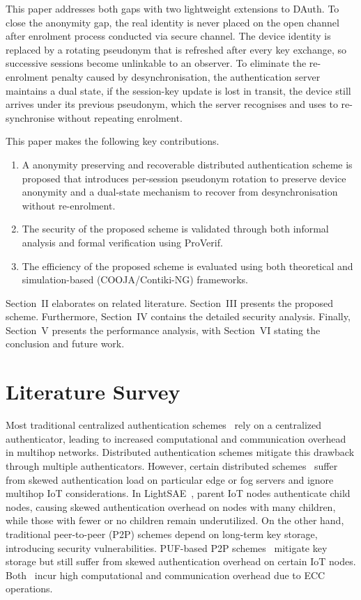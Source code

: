 \documentclass[conference]{IEEEtran}
\begin{document}
This paper addresses both gaps with two lightweight extensions to DAuth.  To close the anonymity gap, the
real identity is never placed on the open channel after enrolment process conducted via secure channel. The device identity is
replaced by a rotating pseudonym that is refreshed after every key exchange, so successive sessions become
unlinkable to an observer.  To eliminate the re-enrolment penalty caused by
desynchronisation, the authentication server maintains a
dual state, if the session-key update is lost in transit, the
device still arrives under its previous pseudonym, which the server recognises
and uses to re-synchronise without repeating enrolment.

This paper makes the following key contributions.
\begin{enumerate}
  \item A anonymity preserving and recoverable distributed authentication scheme is proposed that
    introduces per-session pseudonym rotation to preserve device anonymity and
    a dual-state mechanism to recover from desynchronisation without
    re-enrolment.
  \item The security of the proposed scheme is validated through both
    informal analysis and formal verification using
    ProVerif.
  \item The efficiency of the proposed scheme is evaluated using both
    theoretical and simulation-based (COOJA/Contiki-NG) frameworks.
\end{enumerate}

Section~II elaborates on related literature.  Section~III presents the
proposed scheme.  Furthermore, Section~IV contains the detailed security
analysis.  Finally, Section~V presents the performance analysis, with
Section~VI stating the conclusion and future work.



\section{Literature Survey}

Most traditional centralized authentication schemes~\cite{sheik2023auth,he2023lightweight,roy2025design}
rely on a centralized authenticator, leading to increased computational and
communication overhead in multihop networks.  Distributed authentication schemes
mitigate this drawback through multiple authenticators.  However, certain
distributed schemes~\cite{alruwaili2025raaf} suffer from skewed authentication
load on particular edge or fog servers and ignore multihop IoT considerations.
In LightSAE~\cite{rosa2023lightsae}, parent IoT nodes authenticate child nodes,
causing skewed authentication overhead on nodes with many children, while those
with fewer or no children remain underutilized.  On the other hand, traditional
peer-to-peer (P2P) schemes depend on long-term key storage, introducing security
vulnerabilities.  PUF-based P2P schemes~\cite{zheng2022puf,li2020puf} mitigate
key storage but still suffer from skewed authentication overhead on certain IoT
nodes.  Both~\cite{li2020puf,yang2024sakms} incur high computational and
communication overhead due to ECC operations.
\end{document}

